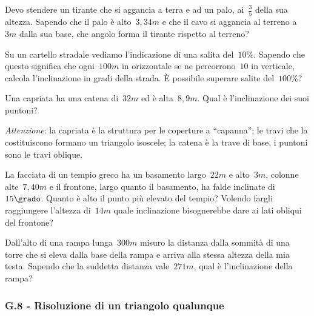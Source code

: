 \begin{multicols}{2}
\begin{esercizio}[\Ast]
\label{ese:G.63}
Devo stendere un tirante che si aggancia a terra e ad un palo, ai~$\frac{3}{5}$ della sua altezza.
Sapendo che il palo è alto~$3,34\unit{m}$ e che il cavo si aggancia al terreno a~$3\unit{m}$ dalla sua base,
che angolo forma il tirante rispetto al terreno?
\end{esercizio}

\begin{esercizio}[\Ast]
\label{ese:G.64}
Su un cartello stradale vediamo l'indicazione di una salita del~$10\%$. Sapendo che questo significa che ogni~$100\unit{m}$
in orizzontale se ne percorrono~$10$ in verticale, calcola l'inclinazione in gradi della strada. È possibile superare salite del~$100\%$?
\end{esercizio}

\begin{esercizio}[\Ast]
\label{ese:G.65}
Una capriata ha una catena di~$32\unit{m}$ ed è alta~$8,9\unit{m}$. Qual è l'inclinazione dei suoi puntoni?

\emph{Attenzione}: la capriata è la struttura per le coperture a ``capanna''; le travi che la costituiscono
formano un triangolo isoscele; la catena è la trave di base, i puntoni sono le travi oblique.
\end{esercizio}

\begin{esercizio}[\Ast]
\label{ese:G.66}
La facciata di un tempio greco ha un basamento largo~$22\unit{m}$ e alto~$3\unit{m}$, colonne alte~$7,40\unit{m}$ e il frontone,
largo quanto il basamento, ha falde inclinate di~$15\grado$. Quanto è alto il punto più elevato del tempio?
Volendo fargli raggiungere l'altezza di~$14\unit{m}$ quale inclinazione bisognerebbe dare ai lati obliqui del frontone?
\end{esercizio}

\begin{esercizio}[\Ast]
\label{ese:G.67}
Dall'alto di una rampa lunga~$300\unit{m}$ misuro la distanza dalla sommità di una torre che si eleva dalla base della rampa e arriva
alla stessa altezza della mia testa. Sapendo che la suddetta distanza vale~$271\unit{m}$, qual è l'inclinazione della rampa?
\end{esercizio}
\end{multicols}

\subsubsection*{G.8 - Risoluzione di un triangolo qualunque}

